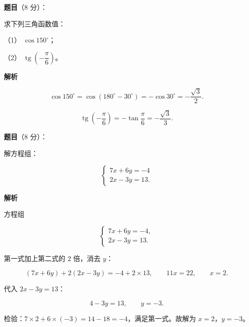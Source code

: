 \begin{answer}

\textbf{题目}（8 分）：

求下列三角函数值：

（1） $\cos150^\circ$；

（2） $\operatorname{tg}\left(-\dfrac{\pi}{6}\right)$。

\textbf{解析}


\nopagebreak[4]
\[
\cos150^\circ=\cos(180^\circ-30^\circ)=-\cos30^\circ=-\frac{\sqrt{3}}{2}.
\]


\nopagebreak[4]
\[
\operatorname{tg}\left(-\frac{\pi}{6}\right)=-\tan\frac{\pi}{6}=-\frac{\sqrt{3}}{3}.
\]



\end{answer}
\begin{answer}

\textbf{题目}（8 分）：

解方程组：

\nopagebreak[4]
\[
\begin{cases}
7x+6y=-4\\
2x-3y=13.
\end{cases}
\]

\textbf{解析}

方程组

\nopagebreak[4]
\[
\begin{cases}
7x+6y=-4,\\
2x-3y=13.
\end{cases}
\]

第一式加上第二式的 $2$ 倍，消去 $y$：

\nopagebreak[4]
\[
(7x+6y)+2(2x-3y)=-4+2\times13,
\qquad
11x=22,
\qquad
x=2.
\]

代入 $2x-3y=13$：

\nopagebreak[4]
\[
4-3y=13,
\qquad
y=-3.
\]

检验：$7\times2+6\times(-3)=14-18=-4$，满足第一式。故解为 $x=2$，$y=-3$。


\end{answer}

